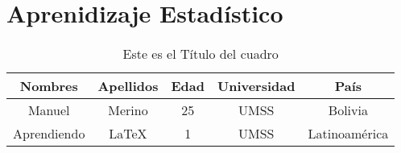 \chapter{Aprenidizaje Estadístico} \label{cap:apren_esta}
	\lipsum \lipsum[1]
	
	\begin{table}
		\centering
		\begin{tabular}{ccccc}
			\hline
			Nombres & Apellidos & Edad & Universidad & País\\
			\hline
			Manuel & Merino & 25 & UMSS & Bolivia\\
			Aprendiendo & \LaTeX & 1 & UMSS & Latinoamérica\\
			\hline
		\end{tabular}
		\caption{Este es el Título del cuadro}
		\label{tab:primera_tabla}
	\end{table}